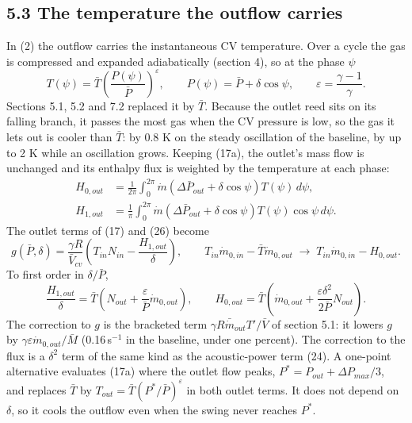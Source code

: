 \subsection*{5.3 The temperature the outflow carries}

In (2) the outflow carries the instantaneous CV temperature. Over a cycle the gas is compressed and expanded adiabatically (section 4), so at the phase $\psi$
\begin{equation}
T(\psi) = \bar T\left(\frac{P(\psi)}{\bar P}\right)^{\varepsilon}, \qquad P(\psi) = \bar P + \delta\cos\psi, \qquad \varepsilon = \frac{\gamma-1}{\gamma} . \tag{17a}
\end{equation}
Sections 5.1, 5.2 and 7.2 replaced it by $\bar T$. Because the outlet reed sits on its falling branch, it passes the most gas when the CV pressure is low, so the gas it lets out is cooler than $\bar T$: by 0.8 K on the steady oscillation of the baseline, by up to 2 K while an oscillation grows. Keeping (17a), the outlet's mass flow is unchanged and its enthalpy flux is weighted by the temperature at each phase:
\begin{equation}
\begin{aligned}
H_{0,out} &= \frac{1}{2\pi}\int_0^{2\pi}\dot m\left(\Delta\bar P_{out} + \delta\cos\psi\right)T(\psi)\,d\psi, \\
H_{1,out} &= \frac{1}{\pi}\int_0^{2\pi}\dot m\left(\Delta\bar P_{out} + \delta\cos\psi\right)T(\psi)\cos\psi\,d\psi .
\end{aligned} \tag{17b}
\end{equation}
The outlet terms of (17) and (26) become
\begin{equation}
g(\bar P,\delta) = \frac{\gamma R}{\bar V_{cv}}\left(T_{in}N_{in} - \frac{H_{1,out}}{\delta}\right), \qquad
T_{in}\dot m_{0,in} - \bar T\dot m_{0,out} \;\to\; T_{in}\dot m_{0,in} - H_{0,out} . \tag{17c}
\end{equation}
To first order in $\delta/\bar P$,
\begin{equation}
\frac{H_{1,out}}{\delta} = \bar T\left(N_{out} + \frac{\varepsilon}{\bar P}\dot m_{0,out}\right), \qquad
H_{0,out} = \bar T\left(\dot m_{0,out} + \frac{\varepsilon\delta^2}{2\bar P}N_{out}\right) . \tag{17d}
\end{equation}
The correction to $g$ is the bracketed term $\gamma R\bar{\dot m}_{out}T'/\bar V$ of section 5.1: it lowers $g$ by $\gamma\varepsilon\dot m_{0,out}/\bar M$ (0.16\,s$^{-1}$ in the baseline, under one percent). The correction to the flux is a $\delta^2$ term of the same kind as the acoustic-power term (24). A one-point alternative evaluates (17a) where the outlet flow peaks, $P^* = P_{out} + \Delta P_{max}/3$, and replaces $\bar T$ by $T_{out} = \bar T(P^*/\bar P)^{\varepsilon}$ in both outlet terms. It does not depend on $\delta$, so it cools the outflow even when the swing never reaches $P^*$.

